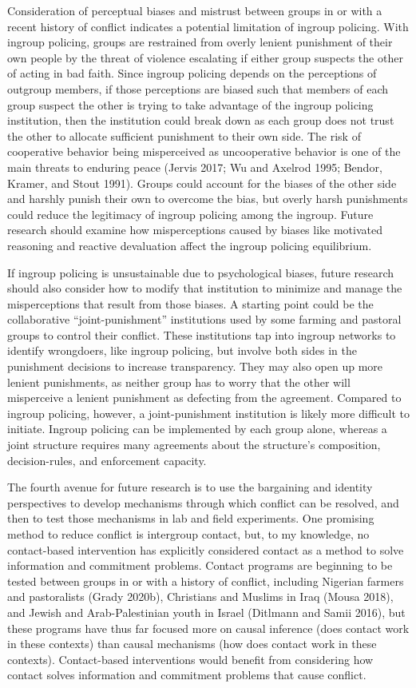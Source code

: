 \documentclass[11pt]{article}
\begin{document}
Consideration of perceptual biases and mistrust between groups in or
with a recent history of conflict indicates a potential limitation of
ingroup policing. With ingroup policing, groups are restrained from
overly lenient punishment of their own people by the threat of violence
escalating if either group suspects the other of acting in bad faith.
Since ingroup policing depends on the perceptions of outgroup members,
if those perceptions are biased such that members of each group suspect
the other is trying to take advantage of the ingroup policing
institution, then the institution could break down as each group does
not trust the other to allocate sufficient punishment to their own side.
The risk of cooperative behavior being misperceived as uncooperative
behavior is one of the main threats to enduring peace (Jervis 2017; Wu
and Axelrod 1995; Bendor, Kramer, and Stout 1991). Groups could account
for the biases of the other side and harshly punish their own to
overcome the bias, but overly harsh punishments could reduce the
legitimacy of ingroup policing among the ingroup. Future research should
examine how misperceptions caused by biases like motivated reasoning and
reactive devaluation affect the ingroup policing equilibrium.

If ingroup policing is unsustainable due to psychological biases, future
research should also consider how to modify that institution to minimize
and manage the misperceptions that result from those biases. A starting
point could be the collaborative ``joint-punishment'' institutions used
by some farming and pastoral groups to control their conflict. These
institutions tap into ingroup networks to identify wrongdoers, like
ingroup policing, but involve both sides in the punishment decisions to
increase transparency. They may also open up more lenient punishments,
as neither group has to worry that the other will misperceive a lenient
punishment as defecting from the agreement. Compared to ingroup
policing, however, a joint-punishment institution is likely more
difficult to initiate. Ingroup policing can be implemented by each group
alone, whereas a joint structure requires many agreements about the
structure's composition, decision-rules, and enforcement capacity.

The fourth avenue for future research is to use the bargaining and
identity perspectives to develop mechanisms through which conflict can
be resolved, and then to test those mechanisms in lab and field
experiments. One promising method to reduce conflict is intergroup
contact, but, to my knowledge, no contact-based intervention has
explicitly considered contact as a method to solve information and
commitment problems. Contact programs are beginning to be tested between
groups in or with a history of conflict, including Nigerian farmers and
pastoralists (Grady 2020b), Christians and Muslims in Iraq (Mousa 2018),
and Jewish and Arab-Palestinian youth in Israel (Ditlmann and Samii
2016), but these programs have thus far focused more on causal inference
(does contact work in these contexts) than causal mechanisms (how does
contact work in these contexts). Contact-based interventions would
benefit from considering how contact solves information and commitment
problems that cause conflict.
\end{document}
